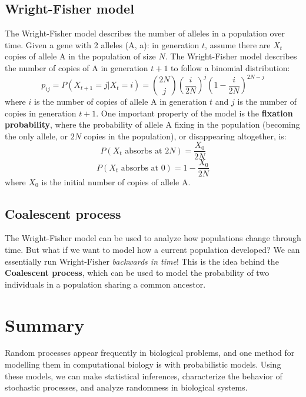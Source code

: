 \documentclass[12pt]{article}
\begin{document}
\subsection{Wright-Fisher model}
The Wright-Fisher model describes the number of alleles in a population over time. Given a gene with 2 alleles (A, a): in generation $t$, assume there are $X_t$ copies of allele A in the population of size $N$. The Wright-Fisher model describes the number of copies of A in generation $t+1$ to follow a binomial distribution:
$$p_{ij} = P(X_{t+1} = j | X_t = i) = \binom{2N}{j} \left( \frac{i}{2N} \right) ^j\left(1-\frac{i}{2N}\right)^{2N-j}$$
where $i$ is the number of copies of allele A in generation $t$ and $j$ is the number of copies in generation $t+1$. One important property of the model is the \textbf{fixation probability}, where the probability of allele A fixing in the population (becoming the only allele, or $2N$ copies in the population), or disappearing altogether, is:
$$P(X_t \text{ absorbs at }2N) = \frac{X_0}{2N}$$
$$P(X_t \text{ absorbs at }0) = 1-\frac{X_0}{2N}$$
where $X_0$ is the initial number of copies of allele A. 
\subsection{Coalescent process}
The Wright-Fisher model can be used to analyze how populations change through time. But what if we want to model how a current population developed? We can essentially run Wright-Fisher \textit{backwards in time}! This is the idea behind the \textbf{Coalescent process}, which can be used to model the probability of two individuals in a population sharing a common ancestor.
\section{Summary}
Random processes appear frequently in biological problems, and one method for modelling them in computational biology is with probabilistic models. Using these models, we can make statistical inferences, characterize the behavior of stochastic processes, and analyze randomness in biological systems.
\end{document}
